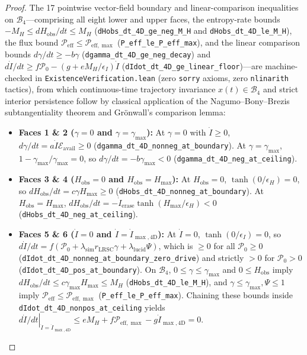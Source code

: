 \documentclass[11pt,a4paper]{article}
\theoremstyle{definition}
\begin{document}
\begin{proof}
The 17 pointwise vector-field boundary and linear-comparison inequalities on $\mathcal{B}_4$---comprising all eight lower and upper faces, the entropy-rate bounds $-M_H \le dH_{\mathrm{obs}}/dt \le M_H$ (\texttt{dHobs\_dt\_4D\_ge\_neg\_M\_H} and \texttt{dHobs\_dt\_4D\_le\_M\_H}), the flux bound $\mathcal{P}_{\mathrm{eff}} \le \mathcal{P}_{\mathrm{eff},\max}$ (\texttt{P\_eff\_le\_P\_eff\_max}), and the linear comparison bounds $d\gamma/dt \ge -b\gamma$ (\texttt{dgamma\_dt\_4D\_ge\_neg\_decay}) and $d\dot{I}/dt \ge f\mathcal{P}_0 - (g + e M_H/\epsilon_I)\dot{I}$ (\texttt{dIdot\_dt\_4D\_ge\_linear\_floor})---are machine-checked in \texttt{ExistenceVerification.lean} (zero \texttt{sorry} axioms, zero \texttt{nlinarith} tactics), from which continuous-time trajectory invariance $x(t) \in \mathcal{B}_4$ and strict interior persistence follow by classical application of the Nagumo--Bony--Brezis subtangentiality theorem and Gr\"onwall's comparison lemma:
\begin{itemize}
  \item \textbf{Faces 1 \& 2 ($\gamma = 0$ and $\gamma = \gamma_{\max}$):} At $\gamma = 0$ with $\dot{I} \ge 0$, $d\gamma/dt = a\dot{I}\mathcal{E}_{\mathrm{avail}} \ge 0$ (\texttt{dgamma\_dt\_4D\_nonneg\_at\_boundary}). At $\gamma = \gamma_{\max}$, $1 - \gamma_{\max}/\gamma_{\max} = 0$, so $d\gamma/dt = -b\gamma_{\max} < 0$ (\texttt{dgamma\_dt\_4D\_neg\_at\_ceiling}).
  \item \textbf{Faces 3 \& 4 ($H_{\mathrm{obs}} = 0$ and $H_{\mathrm{obs}} = H_{\max}$):} At $H_{\mathrm{obs}} = 0$, $\tanh(0/\epsilon_H) = 0$, so $dH_{\mathrm{obs}}/dt = c\gamma H_{\max} \ge 0$ (\texttt{dHobs\_dt\_4D\_nonneg\_at\_boundary}). At $H_{\mathrm{obs}} = H_{\max}$, $dH_{\mathrm{obs}}/dt = -\dot{I}_{\mathrm{erase}}\tanh(H_{\max}/\epsilon_H) < 0$ (\texttt{dHobs\_dt\_4D\_neg\_at\_ceiling}).
  \item \textbf{Faces 5 \& 6 ($\dot{I} = 0$ and $\dot{I} = \dot{I}_{\max,4\mathrm{D}}$):} At $\dot{I} = 0$, $\tanh(0/\epsilon_I) = 0$, so $d\dot{I}/dt = f(\mathcal{P}_0 + \lambda_{\mathrm{sim}}r_{\mathrm{LRSC}}\gamma + \lambda_{\mathrm{lucid}}\Psi)$, which is $\ge 0$ for all $\mathcal{P}_0 \ge 0$ (\texttt{dIdot\_dt\_4D\_nonneg\_at\_boundary\_zero\_drive}) and strictly $> 0$ for $\mathcal{P}_0 > 0$ (\texttt{dIdot\_dt\_4D\_pos\_at\_boundary}). On $\mathcal{B}_4$, $0 \le \gamma \le \gamma_{\max}$ and $0 \le H_{\mathrm{obs}}$ imply $dH_{\mathrm{obs}}/dt \le c\gamma_{\max}H_{\max} \le M_H$ (\texttt{dHobs\_dt\_4D\_le\_M\_H}), and $\gamma \le \gamma_{\max}, \Psi \le 1$ imply $\mathcal{P}_{\mathrm{eff}} \le \mathcal{P}_{\mathrm{eff},\max}$ (\texttt{P\_eff\_le\_P\_eff\_max}). Chaining these bounds inside \texttt{dIdot\_dt\_4D\_nonpos\_at\_ceiling} yields $\left.d\dot{I}/dt\right|_{\dot{I}=\dot{I}_{\max,4\mathrm{D}}} \le e M_H + f\mathcal{P}_{\mathrm{eff},\max} - g\dot{I}_{\max,4\mathrm{D}} = 0$.

\end{itemize}
\end{proof}
\end{document}
